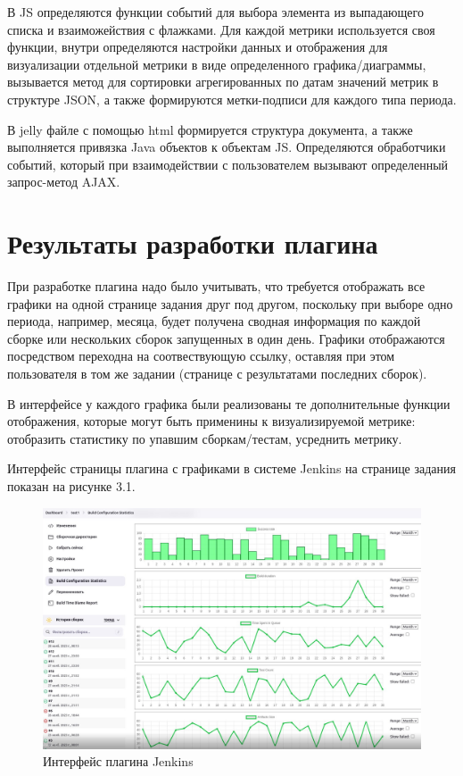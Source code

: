 В JS определяются функции событий для выбора элемента из выпадающего списка и взаиможействия с флажками. Для каждой метрики используется своя функции, внутри определяются настройки данных и отображения для визуализации отдельной метрики в виде определенного графика/диаграммы, вызывается метод для сортировки агрегированных по датам значений метрик в структуре JSON, а также формируются метки-подписи для каждого типа периода.

В jelly файле с помощью html формируется структура документа, а также выполняется привязка Java объектов к объектам JS. Определяются обработчики событий, который при взаимодействии с пользователем вызывают определенный запрос-метод AJAX.

\section{Результаты разработки плагина} \label{ch3:sec2}

При разработке плагина надо было учитывать, что требуется отображать все графики на одной странице задания друг под другом, поскольку при выборе одно периода, например, месяца, будет получена сводная информация по каждой сборке или нескольких сборок запущенных в один день. Графики отображаются посредством переходна на соотвествующую ссылку, оставляя при этом пользователя в том же задании (странице с результатами последних сборок).

В интерфейсе у каждого графика были реализованы те дополнительные функции отображения, которые могут быть применины к визуализируемой метрике: отобразить статистику по упавшим сборкам/тестам, усреднить метрику.

Интерфейс страницы плагина с графиками в системе Jenkins на странице задания показан на рисунке 3.1.


\begin{figure}[ht!] 
	\center
	\includegraphics [scale=0.47] {my_folder/images//ui}
	\caption{Интерфейс плагина Jenkins} 
	\label{fig:ArchitectureJenkins}  
\end{figure}

